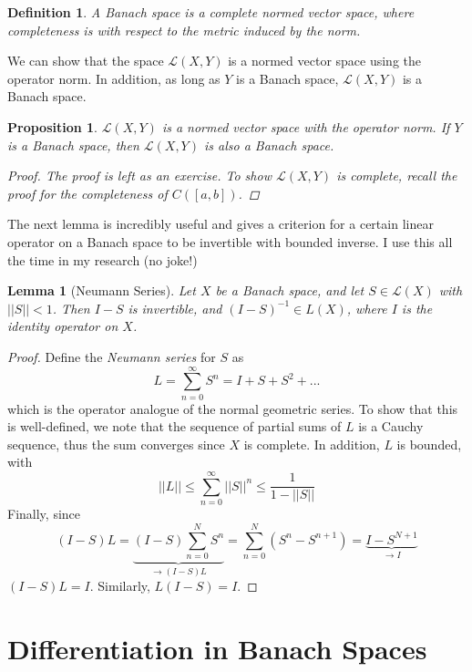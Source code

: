 \documentclass[12pt]{amsart}         %
\newtheorem{definition}{Definition}[section]
\newtheorem{proposition}{Proposition}[section]
\newtheorem{lemma}{Lemma}[section]
\theoremstyle{remark}
\begin{document}
\begin{definition}
A \emph{Banach space} is a complete normed vector space, where completeness is with respect to the metric induced by the norm.
\end{definition}

We can show that the space $\mathcal{L}(X, Y)$ is a normed vector space using the operator norm. In addition, as long as $Y$ is a Banach space, $\mathcal{L}(X, Y)$ is a Banach space.

\begin{proposition}
$\mathcal{L}(X, Y)$ is a normed vector space with the operator norm. If $Y$ is a Banach space, then $\mathcal{L}(X, Y)$ is also a Banach space.
\begin{proof}
The proof is left as an exercise. To show $\mathcal{L}(X, Y)$ is complete, recall the proof for the completeness of $C([a,b])$.
\end{proof}
\end{proposition}

The next lemma is incredibly useful and gives a criterion for a certain linear operator on a Banach space to be invertible with bounded inverse. I use this all the time in my research (no joke!)

\begin{lemma}[Neumann Series]
Let $X$ be a Banach space, and let $S \in \mathcal{L}(X)$ with $||S|| < 1$. Then $I - S$ is invertible, and $(I - S)^{-1} \in L(X)$, where $I$ is the identity operator on $X$.
\end{lemma}

\begin{proof}
Define the \emph{Neumann series} for $S$ as 
\[
L = \sum_{n=0}^{\infty} S^n = I + S + S^2 + ... 
\]
which is the operator analogue of the normal geometric series. To show that this is well-defined, we note that the sequence of partial sums of $L$ is a Cauchy sequence, thus the sum converges since $X$ is complete. In addition, $L$ is bounded,
with
\[
||L|| \leq \sum_{n=0}^\infty ||S||^n \leq \frac{1}{1 - ||S||}
\]
Finally, since
\[(I - S)L = \underbrace{(I - S) \sum_{n=0}^{N} S^n}_{\rightarrow (I-S)L} = \sum_{n=0}^N (S^n - S^{n+1}) = 
\underbrace{I - S^{N+1}}_{\rightarrow I}
\]
$(I-S)L = I$. Similarly, $L(I - S) = I$.
\end{proof}

\section{Differentiation in Banach Spaces}
\end{document}
